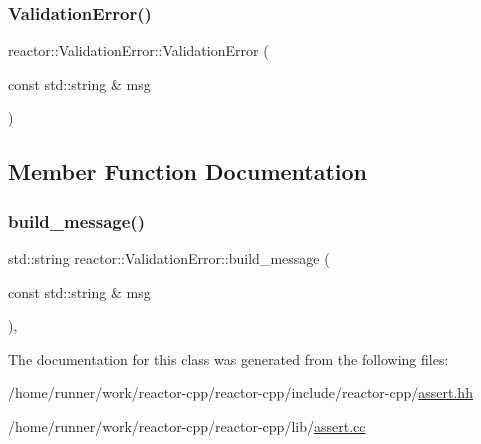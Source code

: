 \subsubsection{\texorpdfstring{Validation\+Error()}{ValidationError()}}
{\footnotesize\ttfamily reactor\+::\+Validation\+Error\+::\+Validation\+Error (\begin{DoxyParamCaption}\item[{const std\+::string \&}]{msg }\end{DoxyParamCaption})\hspace{0.3cm}{\ttfamily [inline]}}



\subsection{Member Function Documentation}
\mbox{\label{classreactor_1_1ValidationError_a5651bea57b5c6ba5e7571172baec633c}} 
\subsubsection{\texorpdfstring{build\+\_\+message()}{build\_message()}}
{\footnotesize\ttfamily std\+::string reactor\+::\+Validation\+Error\+::build\+\_\+message (\begin{DoxyParamCaption}\item[{const std\+::string \&}]{msg }\end{DoxyParamCaption})\hspace{0.3cm}{\ttfamily [static]}, {\ttfamily [private]}}



The documentation for this class was generated from the following files\+:\begin{DoxyCompactItemize}
\item 
/home/runner/work/reactor-\/cpp/reactor-\/cpp/include/reactor-\/cpp/\hyperlink{assert_8hh}{assert.\+hh}\item 
/home/runner/work/reactor-\/cpp/reactor-\/cpp/lib/\hyperlink{assert_8cc}{assert.\+cc}\end{DoxyCompactItemize}

